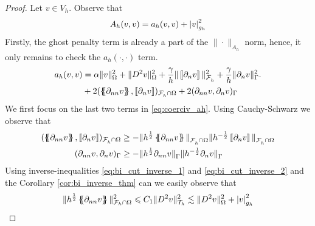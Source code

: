 \begin{proof}
    Let $v \in V_{h}$.
    Observe that
    \begin{equation}
    A_{h}( v,v) = a_{h}( v,v)  + \left\lvert  v  \right\rvert_{g_{h}}^{2}
    \end{equation}
    Firstly, the ghost penalty term is already a part of the $\| \cdot  \|_{ A_{h} }^{  } $ norm, hence, it only remains to check the $a_{h}( \cdot ,\cdot ) $ term.
    \begin{equation}
        \label{eq:coerciv_ah}
    \begin{split}
       a_{h}( v,v) &=   \alpha \| v \|_{   \Omega   }^{2} + \| D^2v \|_{   \Omega  }^{2  }  + \frac{\gamma }{h}  \|  \jump{ \partial _{n} v }\|_{\mathcal{F} _{h}^{}  }^{ 2 } + \frac{\gamma }{h}  \| \partial _{n} v \|_{ \Gamma  }^{ 2 }. \\
                   & + 2 ( \mean{ \partial _{nn} v }, \jump{ \partial _{n} v }    )_{\mathcal{F} ^{}_{h} \cap \Omega }  + 2 (  \partial _{nn} v ,
       \partial _{n} v  )_{\Gamma } \\
    \end{split}
    \end{equation}
    We first focus on the last two terms in \eqref{eq:coerciv_ah}. Using Cauchy-Schwarz we observe that
    \begin{equation}
        \begin{split}
    ( \mean{ \partial _{nn} v }  , \jump{ \partial _{n} v }  )_{\mathcal{F}^{}_{h}\cap \Omega  } & \ge - \| h^{\frac{1}{2}}\mean{ \partial _{nn} v }   \|_{ \mathcal{F}^{}_{h}\cap \Omega   }^{  }  \|h^{-\frac{1}{2}} \jump{ \partial _{n} v }   \|_{
    \mathcal{F}^{}_{h}\cap \Omega   }^{  } \\
    (  \partial _{nn} v   ,  \partial _{n} v   )_{\Gamma   } & \ge - \| h^{\frac{1}{2}} \partial _{nn} v    \|_{ \Gamma    }^{  }  \|h^{-\frac{1}{2}}  \partial _{n} v    \|_{ \Gamma    }^{  }
        \end{split}
    \end{equation}
    Using inverse-inequalities \eqref{eq:bi_cut_inverse_1} and \eqref{eq:bi_cut_inverse_2} and the Corollary \ref{cor:bi_inverse_thm} can we easily observe that
    \begin{equation}
        \begin{split}
     \| h^{\frac{1}{2}} \mean{ \partial _{nn}v } \|_{ \mathcal{F}_{h} \cap \Omega    }^{  2} & \le C_{1} \| D^2 v \|_{ \mathcal{T}_{h}   }^{2  } \lesssim   \| D^2 v \|_{ \Omega  }^{ 2 }  + \abs{ v } _{ g_{h} }^{2  }   \\

\end{split}
\end{equation}
\end{proof}
